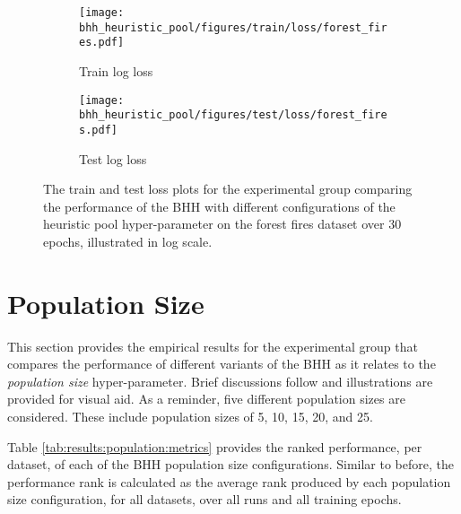 \begin{figure}[H]
	\begin{subfigure}{0.5\textwidth}
		\centering
		\texttt{[image: bhh\_heuristic\_pool/figures/train/loss/forest\_fires.pdf]}
		\caption{Train log loss}
		\label{fig:results:heuristic_pool:figures:loss:train:forest_fires}
	\end{subfigure}
	\begin{subfigure}{0.5\textwidth}
		\centering
		\texttt{[image: bhh\_heuristic\_pool/figures/test/loss/forest\_fires.pdf]}
		\caption{Test log loss}
		\label{fig:results:heuristic_pool:figures:loss:test:forest_fires}
	\end{subfigure}
	\par\bigskip
	\caption{The train and test loss plots for the experimental group comparing the performance of the \acs{BHH} with different configurations of the heuristic pool hyper-parameter on the forest fires dataset over 30 epochs, illustrated in log scale.}
	\label{fig:results:heuristic_pool:figures:forest_fires}
\end{figure}



\section{Population Size}\label{sec:results:population}

This section provides the empirical results for the experimental group that compares the performance of different variants of the \acs{BHH} as it relates to the \textit{population size} hyper-parameter. Brief discussions follow and illustrations are provided for visual aid. As a reminder, five different population sizes are considered. These include population sizes of 5, 10, 15, 20, and 25.

Table \ref{tab:results:population:metrics} provides the ranked performance, per dataset, of each of the \acs{BHH} population size configurations. Similar to before, the performance rank is calculated as the average rank produced by each population size configuration, for all datasets, over all runs and all training epochs.

